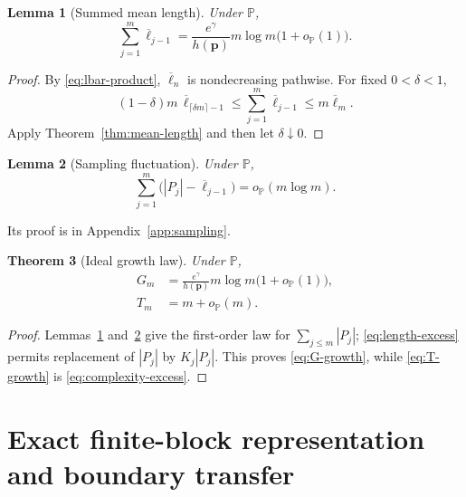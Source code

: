 \documentclass[journal]{IEEEtran}
\theoremstyle{plain}
\newtheorem{theorem}{Theorem}[section]
\newtheorem{lemma}[theorem]{Lemma}
\theoremstyle{definition}
\theoremstyle{remark}
\newcommand{\Pideal}{\mathbb P}
\newcommand{\hp}{h(\mathbf p)}
\newcommand{\lbar}{\overline\ell}
\begin{document}
\begin{lemma}[Summed mean length]\label{lem:summed-mean}
Under $\Pideal$,
\begin{equation}\label{eq:sum-lbar}
 \sum_{j=1}^m\lbar_{j-1}
 =\frac{e^\gamma}{\hp}m\log m\bigl(1+o_{\Pideal}(1)\bigr).
\end{equation}
\end{lemma}

\begin{proof}
By \eqref{eq:lbar-product}, $\lbar_n$ is nondecreasing pathwise.  For fixed $0<\delta<1$,
\begin{equation*}
 (1-\delta)m\,\lbar_{\lceil\delta m\rceil-1}
 \le\sum_{j=1}^m\lbar_{j-1}
 \le m\lbar_m.
\end{equation*}
Apply Theorem~\ref{thm:mean-length} and then let $\delta\downarrow0$.
\end{proof}

\begin{lemma}[Sampling fluctuation]\label{lem:sampling}
Under $\Pideal$,
\begin{equation}\label{eq:sampling}
 \sum_{j=1}^m\bigl(|P_j|-\lbar_{j-1}\bigr)
 =o_{\Pideal}(m\log m).
\end{equation}
\end{lemma}

Its proof is in Appendix~\ref{app:sampling}.

\begin{theorem}[Ideal growth law]\label{thm:ideal-growth}
Under $\Pideal$,
\begin{align}
 G_m&=\frac{e^\gamma}{\hp}m\log m\bigl(1+o_{\Pideal}(1)\bigr),\label{eq:G-growth}\\
 T_m&=m+o_{\Pideal}(m).\label{eq:T-growth}
\end{align}
\end{theorem}

\begin{proof}
Lemmas~\ref{lem:summed-mean} and~\ref{lem:sampling} give the first-order law for $\sum_{j\le m}|P_j|$; \eqref{eq:length-excess} permits replacement of $|P_j|$ by $K_j|P_j|$.  This proves \eqref{eq:G-growth}, while \eqref{eq:T-growth} is \eqref{eq:complexity-excess}.
\end{proof}

\section{Exact finite-block representation and boundary transfer}\label{sec:boundary}
\end{document}
